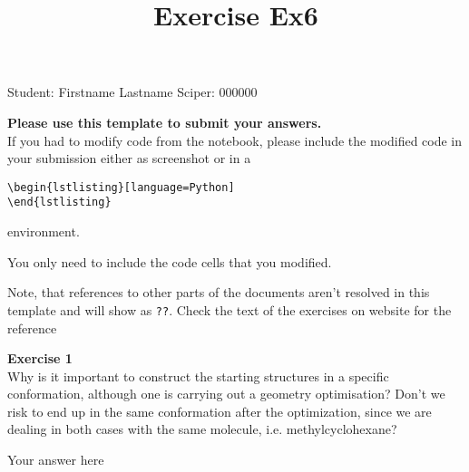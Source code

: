 \documentclass{article}
\title{Exercise Ex6}
\begin{document}
\maketitle\maketitle

Student:  Firstname Lastname    Sciper: 000000

\begin{mdframed}
\textbf{Please use this template to submit your answers.}\\
If you had to modify code from the notebook, please include the modified code in your submission either as screenshot or in a

\begin{verbatim}
\begin{lstlisting}[language=Python]
\end{lstlisting}
\end{verbatim}

environment.

You only need to include the code cells that you modified.

Note, that references to other parts of the documents aren't resolved in this template and will show as \texttt{??}. Check the text of the exercises on website for the reference
\end{mdframed}

\begin{mdframed}
\textbf{Exercise 1}\\
Why is it important to construct the starting structures in a specific conformation, although one is carrying out a geometry optimisation? Don't we risk to end up in the same conformation after the optimization, since we are dealing in both cases with the same molecule, i.e. methylcyclohexane?
\end{mdframed}

Your answer here
\end{document}
